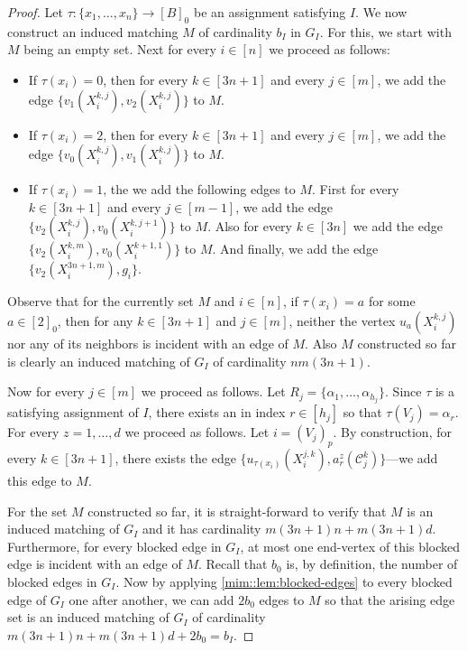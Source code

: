 \documentclass[a4paper,UKenglish,cleveref, autoref, thm-restate]{lipics-v2021}
\begin{document}
\begin{proof}
    Let $\tau \colon \{x_1, \dots, x_n\} \to [B]_0$ be an assignment satisfying $I$. 
    We now construct an induced matching $M$ of cardinality $b_I$ in $G_I$.
    For this, we start with $M$ being an empty set.
    Next for every $i \in [n]$ we proceed as follows:
    \begin{itemize}
     \item If $\tau(x_i) = 0$, then for every $k \in [3n+1]$ and every $j \in [m]$, we add the edge $\{v_1(X_i^{k,j}), v_2(X_i^{k,j})\}$ to $M$. 
     \item If $\tau(x_i) = 2$, then for every $k \in [3n+1]$ and every $j \in [m]$, we add the edge $\{v_0(X_i^{k,j}), v_1(X_i^{k,j})\}$ to $M$.
     \item If $\tau(x_i) = 1$, the we add the following edges to $M$.
     First for every $k \in [3n+1]$ and every $j \in [m-1]$, we add the edge $\{v_2(X_i^{k,j}), v_0(X_i^{k,j+1})\}$ to $M$.
     Also for every $k \in [3n]$ we add the edge $\{v_2(X_i^{k,m}), v_0(X_i^{k+1,1})\}$ to $M$.
     And finally, we add the edge $\{v_2(X_i^{3n+1,m}), g_i\}$.
     \end{itemize}
     Observe that for the currently set $M$ and $i \in [n]$, if $\tau(x_i) = a$ for some $a \in [2]_0$, then for any $k \in [3n+1]$ and $j \in [m]$, neither the vertex $u_a(X_i^{k,j})$ nor any of its neighbors is incident with an edge of $M$.
     Also $M$ constructed so far is clearly an induced matching of $G_I$ of cardinality $nm(3n+1)$.
     
     Now for every $j \in [m]$ we proceed as follows.
     Let $R_j = \{\alpha_1, \dots, \alpha_{h_j}\}$.
     Since $\tau$ is a satisfying assignment of $I$, there exists an in index $r \in [h_j]$ so that $\tau(V_j) = \alpha_r$.
     For every $z = 1, \dots, d$ we proceed as follows.
     Let $i = (V_j)_p$.
     By construction, for every $k \in [3n+1]$, there exists the edge $\{u_{\tau(x_i)} (X_i^{j,k}), a_r^z(\mathcal{C}_j^k)\}$---we add this edge to $M$.
     
     For the set $M$ constructed so far, it is straight-forward to verify that $M$ is an induced matching of $G_I$ and it has cardinality $m(3n+1)n + m(3n+1)d$.
     Furthermore, for every blocked edge in $G_I$, at most one end-vertex of this blocked edge is incident with an edge of $M$.
     Recall that $b_0$ is, by definition, the number of blocked edges in $G_I$.
     Now by applying \cref{mim::lem:blocked-edges} to every blocked edge of $G_I$ one after another, we can add $2b_0$ edges to $M$ so that the arising edge set is an induced matching of $G_I$ of cardinality $m(3n+1)n + m(3n+1)d + 2b_0 = b_I$.
\end{proof}
\end{document}
